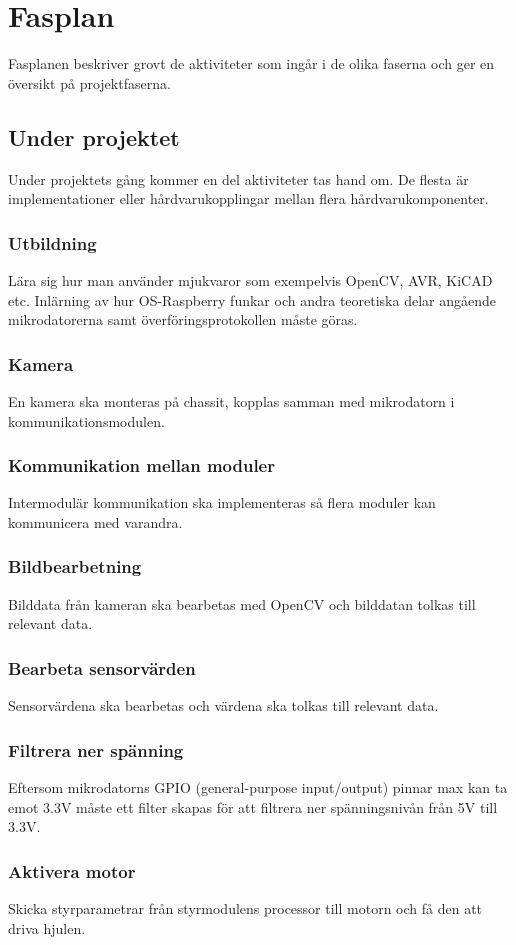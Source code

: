 \documentclass[projektplan/plan.tex]{subfiles}
\begin{document}
\section{Fasplan}
Fasplanen beskriver grovt de aktiviteter som ingår i de olika faserna och ger
en översikt på projektfaserna.
\subsection{Under projektet}
Under projektets gång kommer en del aktiviteter tas hand om. De flesta är
implementationer eller hårdvarukopplingar mellan flera hårdvarukomponenter.
\subsubsection*{Utbildning}
Lära sig hur man använder mjukvaror som exempelvis OpenCV, AVR, KiCAD etc.
Inlärning av hur OS-Raspberry funkar och andra teoretiska delar angående
mikrodatorerna samt överföringsprotokollen måste göras.
\subsubsection*{Kamera}
En kamera ska monteras på chassit, kopplas samman med mikrodatorn i
kommunikationsmodulen.
\subsubsection*{Kommunikation mellan moduler}
Intermodulär kommunikation ska implementeras så flera moduler kan kommunicera
med varandra.
\subsubsection*{Bildbearbetning}
Bilddata från kameran ska bearbetas med OpenCV och bilddatan tolkas till
relevant data.
\subsubsection*{Bearbeta sensorvärden}
Sensorvärdena ska bearbetas och värdena ska tolkas till relevant data.
\subsubsection*{Filtrera ner spänning}
Eftersom mikrodatorns GPIO (general-purpose input/output) pinnar max kan ta
emot 3.3V måste ett filter skapas för att filtrera ner spänningsnivån från 5V
till 3.3V.
\subsubsection*{Aktivera motor}
Skicka styrparametrar från styrmodulens processor till motorn och få den att
driva hjulen.
\end{document}
